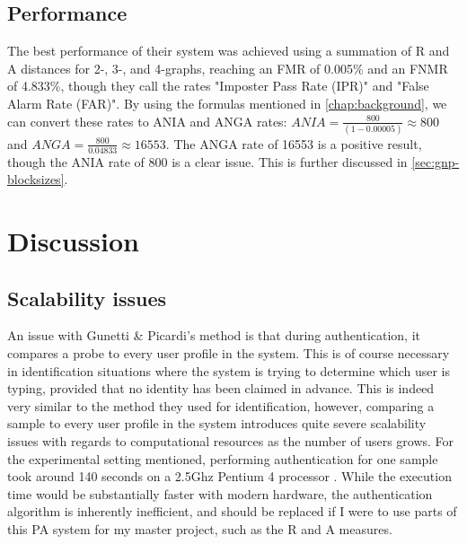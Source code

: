 \documentclass[informationsecurity]{gucmasterproject}
\begin{document}
\subsection{Performance}
The best performance of their system was achieved using a summation of R and A distances for 2-, 3-, and 4-graphs, reaching an FMR of 0.005\% and an FNMR of 4.833\%, though they call the rates "Imposter Pass Rate (IPR)" and "False Alarm Rate (FAR)".
By using the formulas mentioned in \cref{chap:background}, we can convert these rates to ANIA and ANGA rates: $ANIA = \frac{800}{(1-0.00005)} \approx 800$ and $ANGA = \frac{800}{0.04833} \approx 16553$.
The ANGA rate of 16553 is a positive result, though the ANIA rate of 800 is a clear issue.
This is further discussed in \cref{sec:gnp-blocksizes}.

%

\section{Discussion}
\subsection{Scalability issues}
\label{sec:gnp-scalability}
An issue with Gunetti \& Picardi's method is that during authentication, it compares a probe to every user profile in the system.
This is of course necessary in identification situations where the system is trying to determine which user is typing, provided that no identity has been claimed in advance.
This is indeed very similar to the method they used for identification, however, comparing a sample to every user profile in the system introduces quite severe scalability issues with regards to computational resources as the number of users grows.
For the experimental setting mentioned, performing authentication for one sample took around 140 seconds on a 2.5Ghz Pentium 4 processor \cite{gnp}. 
While the execution time would be substantially faster with modern hardware, the authentication algorithm is inherently inefficient, and should be replaced if I were to use parts of this PA system for my master project, such as the R and A measures.
\end{document}
